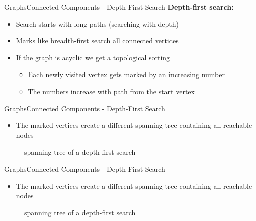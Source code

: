 
\begin{frame}{Graphs}{Connected Components - Depth-First Search}
  \textbf{Depth-first search:}
  \begin{itemize}
    \item<2->
      Search starts with {\color{Mittel-Blau}long paths} (searching with depth)
    \item<3->
      Marks like {\color{Mittel-Blau}breadth-first search} all connected
      vertices
    \item<4->
      If the graph is acyclic we get a {\color{Mittel-Blau}topological sorting}
      \begin{itemize}
        \item<5->
          Each newly visited vertex gets marked by an increasing number
        \item<6->
          The numbers increase with path from the start vertex
      \end{itemize}
  \end{itemize}
\end{frame}


\begin{frame}{Graphs}{Connected Components - Depth-First Search}
  \begin{itemize}
    \item<2->
      The marked vertices create a different spanning tree containing all
      reachable nodes
  \end{itemize}
  \begin{figure}
    \begin{adjustbox}{width=0.95\linewidth}
      
    \end{adjustbox}
    \caption{spanning tree of a depth-first search}
  \end{figure}
\end{frame}


\begin{frame}{Graphs}{Connected Components - Depth-First Search}
  \begin{itemize}
    \item
      The marked vertices create a different spanning tree containing all
      reachable nodes
  \end{itemize}
  \begin{figure}
    \begin{adjustbox}{width=0.95\linewidth}
      
    \end{adjustbox}
    \caption{spanning tree of a depth-first search}
  \end{figure}
\end{frame}

